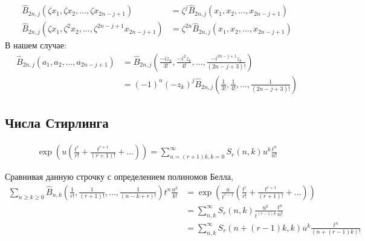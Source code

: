 \documentclass[a4paper, 12pt]{article}
\newenvironment{eqw}{\begin{equation} \begin{aligned}}   
    {\end{aligned}    \end{equation}}
\begin{document}
\begin{eqw}
    \hat{B}_{2n, j}(\zeta x_1, \zeta x_2, \dots, \zeta x_{2n-j+1}) &= \zeta^j \hat{B}_{2n, j}( x_1,  x_2, \dots,  x_{2n-j+1})\\
    \hat{B}_{2n, j}(\zeta x_1, \zeta^2 x_2, \dots, \zeta^{2n-j+1} x_{2n-j+1}) &= \zeta^{2n} \hat{B}_{2n, j}( x_1,  x_2, \dots,  x_{2n-j+1})
\end{eqw}
В нашем случае:
\begin{eqw}
    \hat{B}_{2n, j}\left(a_1, a_2, \dots, a_{2n-j+1}\right) &= 
    \hat{B}_{2n, j}\left(\frac{-i z_k}{3!}, \frac{-i^2 z_k}{4!}, \dots, \frac{-i^{2n-j+1} z_k}{(2n-j+3)!}\right) \\
    &= (-1)^n(-z_k)^{j}\hat{B}_{2n, j}\left(\frac{1}{3!}, \frac{1}{4!}, \dots, \frac{1}{(2n-j+3)!}\right)
\end{eqw}

\subsection*{Числа Стирлинга}
\begin{eqw}
    \exp\left(u\left(\frac{t^r}{r!}+\frac{t^{r+1}}{\left(r+1\right)!}+\dots\right)\right) = \sum\limits_{n=(r+1)k, k = 0}^{\infty} S_{r}(n, k) u^k \frac{t^n}{n!}
\end{eqw}

Сравнивая данную строчку с определением полиномов Белла,
\begin{eqw}
    \sum\limits_{n\geq k\geq 0} 
    \hat{B}_{n, k}\left(\frac{1}{r!}, \frac{1}{(r+1)!}, \dots, \frac{1}{(n-k+r)!}\right) t^n \frac{u^k}{k!} &= 
    \exp\left(\frac{u}{t^{r-1}} \left(\frac{t^r}{r!} + \frac{t^{r+1}}{(r+1)!}+\dots \right)\right) \\ 
    &= \sum\limits_{n, k}^{\infty} S_{r}(n, k) \frac{u^k}{t^{(r-1)k}}\frac{t^n}{n!} \\
    &= \sum\limits_{n, k}^{\infty} S_{r}(n+(r-1)k, k) u^k\frac{t^n}{(n+(r-1)k)!}
\end{eqw}
\end{document}
